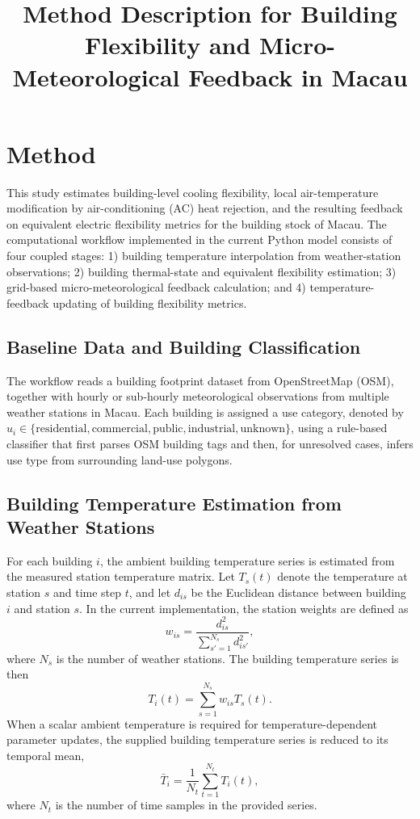 \documentclass[conference]{IEEEtran}
\title{Method Description for Building Flexibility and Micro-Meteorological Feedback in Macau}
\author{\IEEEauthorblockN{Project Method Draft}}
\begin{document}
\maketitle

\section{Method}
This study estimates building-level cooling flexibility, local air-temperature modification by air-conditioning (AC) heat rejection, and the resulting feedback on equivalent electric flexibility metrics for the building stock of Macau. The computational workflow implemented in the current Python model consists of four coupled stages: 1) building temperature interpolation from weather-station observations; 2) building thermal-state and equivalent flexibility estimation; 3) grid-based micro-meteorological feedback calculation; and 4) temperature-feedback updating of building flexibility metrics.

\subsection{Baseline Data and Building Classification}
The workflow reads a building footprint dataset from OpenStreetMap (OSM), together with hourly or sub-hourly meteorological observations from multiple weather stations in Macau. Each building is assigned a use category, denoted by $u_i \in \{\text{residential}, \text{commercial}, \text{public}, \text{industrial}, \text{unknown}\}$, using a rule-based classifier that first parses OSM building tags and then, for unresolved cases, infers use type from surrounding land-use polygons.

\subsection{Building Temperature Estimation from Weather Stations}
For each building $i$, the ambient building temperature series is estimated from the measured station temperature matrix. Let $T_s(t)$ denote the temperature at station $s$ and time step $t$, and let $d_{is}$ be the Euclidean distance between building $i$ and station $s$. In the current implementation, the station weights are defined as
\begin{equation}
    w_{is} = \frac{d_{is}^2}{\sum_{s'=1}^{N_s} d_{is'}^2},
\end{equation}
where $N_s$ is the number of weather stations. The building temperature series is then
\begin{equation}
    T_i(t) = \sum_{s=1}^{N_s} w_{is} T_s(t).
\end{equation}
When a scalar ambient temperature is required for temperature-dependent parameter updates, the supplied building temperature series is reduced to its temporal mean,
\begin{equation}
    \bar{T}_i = \frac{1}{N_t} \sum_{t=1}^{N_t} T_i(t),
\end{equation}
where $N_t$ is the number of time samples in the provided series.
\end{document}

